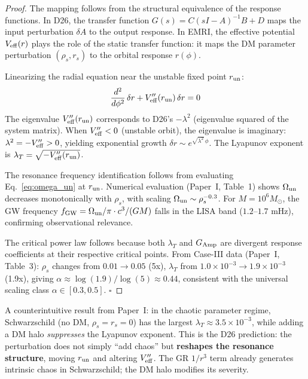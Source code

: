 \begin{proof}
The mapping follows from the structural equivalence of the response functions. In D26, the transfer function $G(s) = C(sI - A)^{-1}B + D$ maps the input perturbation $\delta A$ to the output response. In EMRI, the effective potential $V_{\rm eff}(r)$ plays the role of the static transfer function: it maps the DM parameter perturbation $(\rho_s, r_s)$ to the orbital response $r(\phi)$.

Linearizing the radial equation near the unstable fixed point $r_{\rm un}$:
\begin{equation}
\frac{d^2}{d\phi^2}\,\delta r + V_{\rm eff}''(r_{\rm un})\,\delta r = 0
\end{equation}
The eigenvalue $V_{\rm eff}''(r_{\rm un})$ corresponds to D26's $- \lambda^2$ (eigenvalue squared of the system matrix). When $V_{\rm eff}'' < 0$ (unstable orbit), the eigenvalue is imaginary: $\lambda^2 = -V_{\rm eff}'' > 0$, yielding exponential growth $\delta r \sim e^{\sqrt{\lambda^2}\,\phi}$. The Lyapunov exponent is $\lambda_T = \sqrt{-V_{\rm eff}''(r_{\rm un})}$.

The resonance frequency identification follows from evaluating Eq.~\eqref{eq:omega_un} at $r_{\rm un}$. Numerical evaluation (Paper~I, Table~1) shows $\Omega_{\rm un}$ decreases monotonically with $\rho_s$, with scaling $\Omega_{\rm un} \sim \rho_s^{-0.3}$. For $M = 10^6 M_\odot$, the GW frequency $f_{\rm GW} = \Omega_{\rm un}/\pi \cdot c^3/(GM)$ falls in the LISA band ($1.2$--$1.7$ mHz), confirming observational relevance.

The critical power law follows because both $\lambda_T$ and $G_{\rm Amp}$ are divergent response coefficients at their respective critical points. From Case-III data (Paper~I, Table~3): $\rho_s$ changes from $0.01 \to 0.05$ (5x), $\lambda_T$ from $1.0 \times 10^{-3} \to 1.9 \times 10^{-3}$ (1.9x), giving $\alpha \approx \log(1.9)/\log(5) \approx 0.44$, consistent with the universal scaling class $\alpha \in [0.3, 0.5]$. $\square$
\end{proof}

\begin{remark}
A counterintuitive result from Paper~I: in the chaotic parameter regime, Schwarzschild (no DM, $\rho_s = r_s = 0$) has the largest $\lambda_T \approx 3.5 \times 10^{-3}$, while adding a DM halo \textit{suppresses} the Lyapunov exponent. This is the D26 prediction: the perturbation does not simply ``add chaos'' but \textbf{reshapes the resonance structure}, moving $r_{\rm un}$ and altering $V_{\rm eff}''$. The GR $1/r^3$ term already generates intrinsic chaos in Schwarzschild; the DM halo modifies its severity.
\end{remark}

